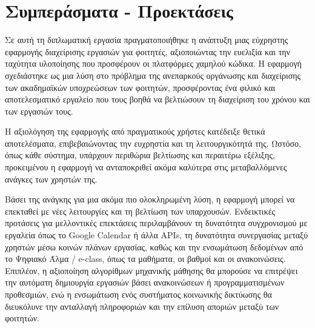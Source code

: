 \chapter{Συμπεράσματα - Προεκτάσεις}
    Σε αυτή τη διπλωματική εργασία πραγματοποιήθηκε η ανάπτυξη μιας εύχρηστης εφαρμογής διαχείρισης εργασιών για φοιτητές, αξιοποιώντας την ευελιξία και την ταχύτητα υλοποίησης που προσφέρουν οι πλατφόρμες χαμηλού κώδικα. Η εφαρμογή σχεδιάστηκε ως μια λύση στο πρόβλημα της ανεπαρκούς οργάνωσης και διαχείρισης των ακαδημαϊκών υποχρεώσεων των φοιτητών, προσφέροντας ένα φιλικό και αποτελεσματικό εργαλείο που τους βοηθά να βελτιώσουν τη διαχείριση του χρόνου και των εργασιών τους.

    Η αξιολόγηση της εφαρμογής από πραγματικούς χρήστες κατέδειξε θετικά αποτελέσματα, επιβεβαιώνοντας την ευχρηστία και τη λειτουργικότητά της. Ωστόσο, όπως κάθε σύστημα, υπάρχουν περιθώρια βελτίωσης και περαιτέρω εξέλιξης, προκειμένου η εφαρμογή να ανταποκριθεί ακόμα καλύτερα στις μεταβαλλόμενες ανάγκες των χρηστών της.

    Βάσει της ανάγκης για μια ακόμα πιο ολοκληρωμένη λύση, η εφαρμογή μπορεί να επεκταθεί με νέες λειτουργίες και τη βελτίωση των υπαρχουσών. Ενδεικτικές προτάσεις για μελλοντικές επεκτάσεις περιλαμβάνουν τη δυνατότητα συγχρονισμού με εργαλεία όπως το Google Calendar ή άλλα APIs, τη δυνατότητα συνεργασίας μεταξύ χρηστών μέσω κοινών πλάνων εργασίας, καθώς και την ενσωμάτωση δεδομένων από το Ψηφιακό Άλμα / e-class, όπως τα μαθήματα, οι βαθμοί και οι ανακοινώσεις. Επιπλέον, η αξιοποίηση αλγορίθμων μηχανικής μάθησης θα μπορούσε να επιτρέψει την αυτόματη δημιουργία εργασιών βάσει ανακοινώσεων ή προγραμματισμένων προθεσμιών, ενώ η ενσωμάτωση ενός συστήματος κοινωνικής δικτύωσης θα διευκόλυνε την ανταλλαγή πληροφοριών και την επίλυση αποριών μεταξύ των φοιτητών.
